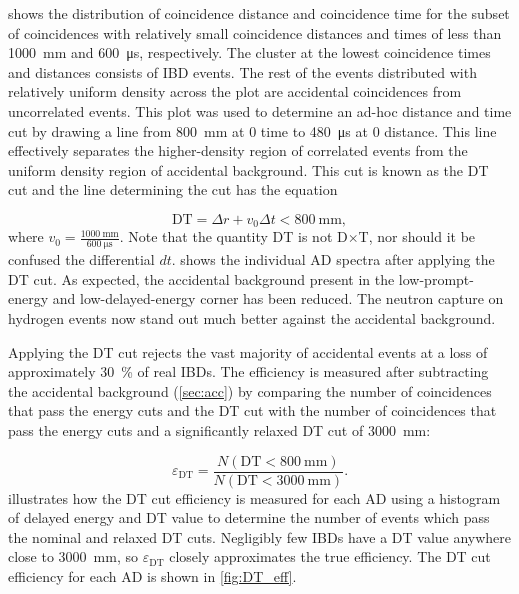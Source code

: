 shows the distribution of
coincidence distance and coincidence time
for the subset of  coincidences with
relatively small coincidence distances and times
of less than \SI{1000}{\milli\meter} and \SI{600}{\micro\second},
respectively.
The cluster at the lowest coincidence times and distances
consists of IBD events.
The rest of the events distributed with relatively uniform density
across the plot are accidental coincidences from uncorrelated events.
This plot was used to determine an ad-hoc distance and time cut
by drawing a line from \SI{800}{\milli\meter} at $0$ time
to \SI{480}{\micro\second} at $0$ distance.
This line effectively separates the higher-density region
of correlated events from the uniform density region of accidental background.
This cut is known as the DT cut and the line determining the cut has the equation

\begin{equation}
    \text{DT} = \Delta r + v_0 \Delta t < \SI{800}{\milli\meter},
\end{equation}
where $v_0 = \frac{\SI{1000}{\milli\meter}}{\SI{600}{\micro\second}}$.
Note that the quantity DT is not D$\times$T,
nor should it be confused the differential $dt$.
 shows the individual AD spectra
after applying the DT cut.
As expected, the accidental background present
in the low-prompt-energy and low-delayed-energy corner has been reduced.
The neutron capture on hydrogen events now stand out much better
against the accidental background.


Applying the DT cut rejects the vast majority of accidental events
at a loss of approximately \SI{30}{\percent} of real IBDs.
The efficiency is measured after subtracting the accidental background
(\cref{sec:acc})
by comparing the number of  coincidences that pass the energy cuts and the DT cut
with the number of  coincidences that pass the energy cuts
and a significantly relaxed DT cut of \SI{3000}{\milli\meter}:

\begin{equation}
    \varepsilon_{\text{DT}} = \frac{N(\text{DT} < \SI{800}{\milli\meter})}{
    N(\text{DT} < \SI{3000}{\milli\meter})}.
\end{equation}
 illustrates how the DT cut efficiency is measured
for each AD using a histogram of delayed energy and DT value
to determine the number of events which pass the nominal and relaxed DT cuts.
Negligibly few IBDs have a DT value anywhere close to \SI{3000}{\milli\meter},
so $\varepsilon_{\text{DT}}$ closely approximates the true efficiency.
The DT cut efficiency for each AD is shown in \cref{fig:DT_eff}.

